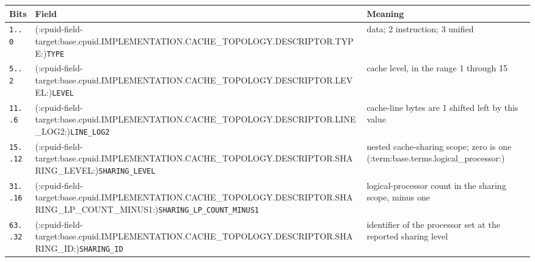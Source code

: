\Needspace{1.25in}
\begingroup\footnotesize
\setlength{\aboverulesep}{0pt}
\setlength{\belowrulesep}{0pt}
\setlength{\extrarowheight}{1.2pt}
\begin{center}
\begin{tabularx}{\linewidth}{@{}>{\raggedright\arraybackslash}p{0.65in}>{\raggedright\arraybackslash}p{2.10in}>{\raggedright\arraybackslash}X@{}}
\toprule
\rowcolor{BedrockHeaderFill}
\textbf{Bits} & \textbf{Field} & \textbf{Meaning}\\
\midrule
\texttt{1..0} & (:cpuid-field-target:base.cpuid.IMPLEMENTATION.CACHE_TOPOLOGY.DESCRIPTOR.TYPE:)\texttt{TYPE} & 1 data; 2 instruction; 3 unified\\
\texttt{5..2} & (:cpuid-field-target:base.cpuid.IMPLEMENTATION.CACHE_TOPOLOGY.DESCRIPTOR.LEVEL:)\texttt{LEVEL} & cache level, in the range 1 through 15\\
\texttt{11..6} & (:cpuid-field-target:base.cpuid.IMPLEMENTATION.CACHE_TOPOLOGY.DESCRIPTOR.LINE_LOG2:)\texttt{LINE\_LOG2} & cache-line bytes are 1 shifted left by this value\\
\texttt{15..12} & (:cpuid-field-target:base.cpuid.IMPLEMENTATION.CACHE_TOPOLOGY.DESCRIPTOR.SHARING_LEVEL:)\texttt{SHARING\_LEVEL} & nested cache-sharing scope; zero is one (:term:base.terms.logical_processor:)\\
\texttt{31..16} & (:cpuid-field-target:base.cpuid.IMPLEMENTATION.CACHE_TOPOLOGY.DESCRIPTOR.SHARING_LP_COUNT_MINUS1:)\texttt{SHARING\_LP\_COUNT\_MINUS1} & logical-processor count in the sharing scope, minus one\\
\texttt{63..32} & (:cpuid-field-target:base.cpuid.IMPLEMENTATION.CACHE_TOPOLOGY.DESCRIPTOR.SHARING_ID:)\texttt{SHARING\_ID} & identifier of the processor set at the reported sharing level\\
\bottomrule
\end{tabularx}
\end{center}
\endgroup
